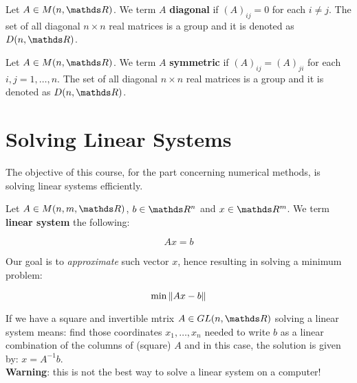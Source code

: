\documentclass[computationalMathematics.tex]{subfiles}
\begin{document}
\begin{definition}
  Let $A \in M(n, \R)$. We term $A$ \textbf{diagonal} if ${(A)}_{ij} = 0$ for each $i \neq j$.
  The set of all diagonal $n \times n$ real matrices is a group and it is denoted as $D(n, \R)$.
\end{definition}

\begin{definition}
  Let $A \in M(n, \R)$. We term $A$ \textbf{symmetric} if ${(A)}_{ij} = {(A)}_{ji}$ for each $i,j = 1, \ldots, n$.
  The set of all diagonal $n \times n$ real matrices is a group and it is denoted as $D(n, \R)$.

\end{definition}

\section{Solving Linear Systems}
The objective of this course, for the part concerning numerical methods, is solving linear systems efficiently.

\begin{definition}
  Let $A \in M(n, m, \R)$, $b \in \R^n$ and $x \in \R^m$. We term \textbf{linear system} the following:

  \[
Ax = b
  \]
\end{definition}

\noindent Our goal is to \emph{approximate} such vector $x$, hence resulting in solving a minimum problem:

\[
  \min\limits \left\lVert Ax - b\right\rVert
\]

If we have a square and invertible mtrix $A \in GL(n, \R)$ solving a linear system means: find those coordinates $x_1, \dots , x_n$ needed to write $b$ as a linear combination of the columns of (square) $A$ and in this case, the solution is given by: $x = A^{-1}b$. \\
\textbf{Warning}: this is not the best way to solve a linear system on a computer!\\

\end{document}
